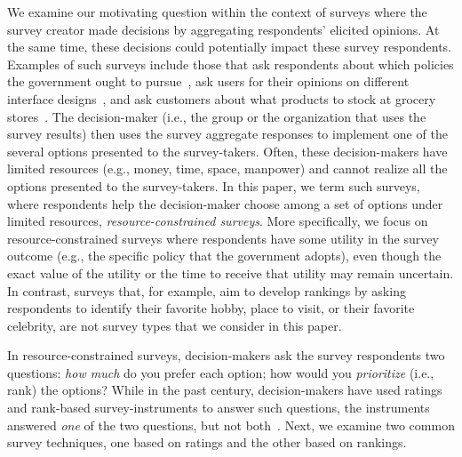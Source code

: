 We examine our motivating question within the context of surveys where the survey creator made decisions by aggregating respondents' elicited opinions. At the same time, these decisions could potentially impact these survey respondents. Examples of such surveys include those that ask respondents about which policies the government ought to pursue~\cite{pew_spending}, ask users for their opinions on different interface designs~\cite{ledo2018evaluation}, and ask customers about what products to stock at grocery stores~\cite{nielsen}. The decision-maker (i.e., the group or the organization that uses the survey results) then uses the survey aggregate responses to implement one of the several options presented to the survey-takers. Often, these decision-makers have limited resources (e.g., money, time, space, manpower) and cannot realize all the options presented to the survey-takers. In this paper, we term such surveys, where respondents help the decision-maker choose among a set of options under limited resources, \textit{resource-constrained surveys}. More specifically, we focus on resource-constrained surveys where respondents have some utility in the survey outcome (e.g., the specific policy that the government adopts), even though the exact value of the utility or the time to receive that utility may remain uncertain. In contrast, surveys that, for example, aim to develop rankings by asking respondents to identify their favorite hobby, place to visit, or their favorite celebrity, are not survey types that we consider in this paper. 

In resource-constrained surveys, decision-makers ask the survey respondents two questions: \textit{how much} do you prefer each option; how would you \textit{prioritize} (i.e., rank) the options? While in the past century, decision-makers have used ratings and rank-based survey-instruments to answer such questions, the instruments answered \emph{one} of the two questions, but not both~\cite{moors2016two}.  Next, we examine two common survey techniques, one based on ratings and the other based on rankings.






